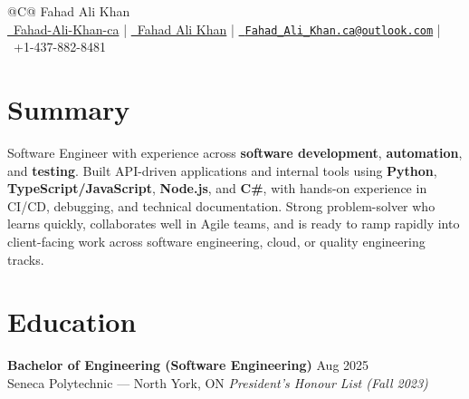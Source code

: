 \documentclass[a4paper,11pt]{article}
\begin{document}
\pagestyle{empty}

\begin{tabularx}{\linewidth}{@{}C@{}}
\Huge{Fahad Ali Khan} \\[4pt]
{\small
\href{https://github.com/Fahad-Ali-Khan-ca}{\raisebox{-0.05\height}\faGithub\ Fahad-Ali-Khan-ca} \;|\;
\href{https://www.linkedin.com/in/fahad-ali-khan-59a182228/}{\raisebox{-0.05\height}\faLinkedin\ Fahad Ali Khan} \;|\;
\href{mailto:Fahad_Ali_Khan.ca@outlook.com}{\raisebox{-0.05\height}\faEnvelope\ \texttt{Fahad\_Ali\_Khan.ca@outlook.com}} \;|\;
\raisebox{-0.05\height}\faMobile\ +1-437-882-8481
}
\end{tabularx}

\section*{Summary}
Software Engineer with experience across \textbf{software development}, \textbf{automation}, and \textbf{testing}. Built API-driven applications and internal tools using \textbf{Python}, \textbf{TypeScript/JavaScript}, \textbf{Node.js}, and \textbf{C\#}, with hands-on experience in CI/CD, debugging, and technical documentation. Strong problem-solver who learns quickly, collaborates well in Agile teams, and is ready to ramp rapidly into client-facing work across software engineering, cloud, or quality engineering tracks.

\section*{Education}
\textbf{Bachelor of Engineering (Software Engineering)} \hfill Aug 2025 \\
Seneca Polytechnic — North York, ON \hfill \textit{President’s Honour List (Fall 2023)}

\end{document}
